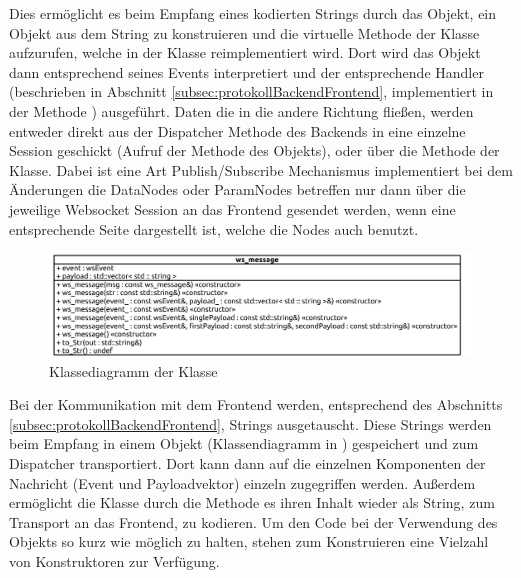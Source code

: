 Dies ermöglicht es beim Empfang eines kodierten Strings durch das  Objekt, ein  Objekt aus dem String zu konstruieren
und die virtuelle Methode  der  Klasse aufzurufen, welche in der  Klasse reimplementiert wird.
Dort wird das  Objekt dann entsprechend seines Events interpretiert und der entsprechende Handler (beschrieben in Abschnitt \ref{subsec:protokollBackendFrontend}, 
implementiert in der Methode ) ausgeführt.
Daten die in die andere Richtung fließen, werden entweder direkt aus der Dispatcher Methode des Backends in eine einzelne Session geschickt (Aufruf der Methode  des  Objekts), 
oder über die Methode  der  Klasse.
Dabei ist eine Art Publish/Subscribe Mechanismus implementiert bei dem Änderungen die DataNodes oder ParamNodes betreffen nur dann über die jeweilige Websocket Session an das Frontend gesendet werden, wenn eine entsprechende Seite dargestellt ist, welche die Nodes auch benutzt.
\begin{figure}[ht]
  \centering
  \includegraphics[width=\textwidth]{content/hauptteil/umsetzungPoC/backend/uml/classesOfOverview/ws_message.pdf}
  \caption{Klassediagramm der Klasse }
  \label{fig:backend:classDiag:wsMsg}
\end{figure}
Bei der Kommunikation mit dem Frontend werden, entsprechend des Abschnitts \ref{subsec:protokollBackendFrontend}, Strings ausgetauscht. 
Diese Strings werden beim Empfang in einem  Objekt (Klassendiagramm in ) gespeichert und zum Dispatcher transportiert. 
Dort kann dann auf die einzelnen Komponenten der Nachricht (Event und Payloadvektor) einzeln zugegriffen werden.
Außerdem ermöglicht die Klasse durch die Methode  es ihren Inhalt wieder als String, zum Transport an das Frontend, zu kodieren.
Um den Code bei der Verwendung des  Objekts so kurz wie möglich zu halten, stehen zum Konstruieren eine Vielzahl von Konstruktoren zur Verfügung.

